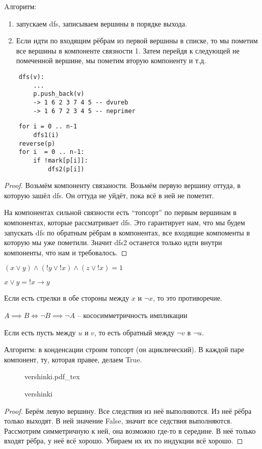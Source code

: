 \documentclass{book}
\theoremstyle{definition}
\newcommand{\incfig}[1]{%
    \def\svgwidth{\columnwidth}
    {#1.pdf_tex}
}
\begin{document}
Aлгоритм:
\begin{enumerate}
    \item запускаем dfs, записываем вершины в порядке выхода. 
    \item Если идти по входящим рёбрам из первой вершины в списке, то мы пометим все вершины в компоненте связности 1. Затем перейдя к следующей не помеченной вершине, мы пометим вторую компоненту и т.д.
\end{enumerate}
\begin{lstlisting}
    dfs(v):
        ...
        p.push_back(v)
        -> 1 6 2 3 7 4 5 -- dvureb
        -> 1 6 7 2 3 4 5 -- neprimer
\end{lstlisting}

\begin{lstlisting}
    for i = 0 .. n-1
        dfs1(i)
    reverse(p)
    for i  = 0 .. n-1:
        if !mark[p[i]]:
            dfs2(p[i])
\end{lstlisting}
\begin{proof}
    Возьмём компоненту связаности. Возьмём первую вершину оттуда, в которую зашёл dfs. Он оттуда не уйдёт, пока всё в ней не пометит. 

    На компонентах сильной связности есть ``топсорт'' по первым вершинам в компонентах, которые рассматривает dfs. Это гарантирует нам, что мы будем запускать dfs по обратным рёбрам в компонентах, все входящие компоменты в которую мы уже пометили. Значит dfs2 останется только идти внутри компоненты, что нам и требовалось.
\end{proof}


\begin{problem}
    [2-SAT]    
$(x\vee y)\land(!y\lor !x)\land(z\lor !x) = 1 $

$x\lor y = !x \to y$

Если есть стрелки в обе стороны между  $x $ и  $\neg x$, то это противоречие.

$A \implies B \iff  \neg B \implies \neg A $ -- кососимметричность импликации

Если есть пусть между $u$ и  $v$, то есть обратный между  $\neg v$ в  $\neg u$.

Алгоритм:
в конденсации строим топсорт (он ациклический). В каждой паре компонент, ту, которая правее, делаем True.
\end{problem}

\begin{figure}[!ht]
    \centering
    \incfig{vershinki}
    \caption{vershinki}
    \label{fig:vershinki}
\end{figure}

\begin{proof}
    Берём левую вершину. Все следствия из неё выполняются. Из неё рёбра только выходят. В ней значение False, значит все седствия выполняются. Рассмотрим симметричную к ней, она возможно где-то в середине. В неё только входят рёбра, у неё всё хорошо. Убираем их их по индукции всё хорошо.
\end{proof}
\end{document}
